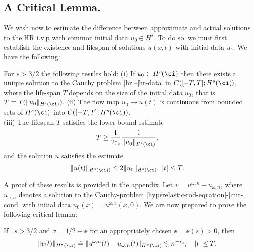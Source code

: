 	 \subsection{A Critical Lemma.}
	We wish now to estimate the difference between approximate and actual solutions to
	the HR i.v.p with common initial data $u_0 \in H^s$. To do so, we must first
	establish the existence and lifespan of solutions $u(x,t)$ with initial data $u_0$.
	We have the following:
\begin{theorem}
	\label{thm:HR_existence_continous_dependence}
For  $s>3/2$  the following  results  hold:
%
\noindent
(i) If $u_0\in H^s(\ci)$  then  there exists a unique solution to
the Cauchy problem  \eqref{hr}--\eqref{hr-data} 
  in $C([-T, T]; H^s(\ci))$, where the life-span  $T$ depends on the size
  of the initial data $u_0$, that is
  $T=T(\|u_0 \|_{H^s(\ci)})$.
  \noindent
(ii)
 The flow  map $u_0 \to u(t)$  is continuous from
 bounded sets of $H^s(\ci)$ into $C([-T, T]; H^s(\ci))$.
%
 \noindent
\\
(iii)  The  lifespan $T$ satisfies the lower bound estimate 
%
     \begin{equation}
   \label{Life-span-est}
T
\ge
\frac{1}{2c_s}
\frac{1}{\|
u_0
  \|_{H^s(\ci)}},
   \end{equation}
and the solution $u$ satisfies the estimate
%
     \begin{equation}
   \label{u_x-Linfty-Hs}
\|
u(t)
  \|_ {H^s(\ci))}
  \le
  2
  \|
u_0
  \|_{H^s(\ci)},\,\, |t|\le T.
   \end{equation}
 \end{theorem}
%
A proof of these results is provided in the appendix.
%
%
%
Let $v=u^{\omega,n} -
u_{\omega,n}$, where $u_{\omega,n}$ denotes a solution to
the Cauchy-problem \eqref{hyperelastic-rod-equation}-\eqref{init-cond} with
initial data $u_0(x) = u^{\omega,n}(x,0)$. We are now prepared to prove the following critical lemma:
\begin{lemma}
	\label{lem:bound_for_difference-of-approx-actual-soln}
	If \ $s > 3/2 $ and $\sigma = 1/2 + \ee$ for an appropriately
	chosen $\ee = \ee(s) > 0$, then 
			\begin{equation} 
				\|
				v(t)
				\|_{H^\sigma(\ci)}
				\doteq
				\label{differ-Hsigma-est} 
				\|
				u^{\omega, n}(t) 
				- 
				u_{\omega, n}(t)
				\|_{H^\sigma(\ci)}
				\lesssim 
				n^{-r_s}, 
				\quad
				|t| \le T.
			\end{equation}
			\end{lemma}

